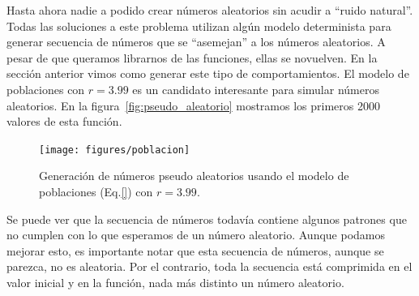 \documentclass[a4paper,10pt]{book}
\begin{document}
 
 Hasta ahora nadie a podido crear números aleatorios sin acudir a ``ruido natural''.
 Todas las soluciones a este problema utilizan algún modelo determinista para generar secuencia de números que se ``asemejan'' a los números aleatorios.
 A pesar de que queramos librarnos de las funciones, ellas se novuelven.
 En la sección anterior vimos como generar este tipo de comportamientos.
 El modelo de poblaciones con $r = 3.99$ es un candidato interesante para simular números aleatorios.
 En la figura~\ref{fig:pseudo_aleatorio} mostramos los primeros 2000 valores de esta función.
 \begin{figure}[ht!]
    \centering
    \texttt{[image: figures/poblacion]}
    \caption{Generación de números pseudo aleatorios usando el modelo de poblaciones (Eq.\ref{}) con $r=3.99$.}
    \label{fig:sensibilidad}
 \end{figure}
 Se puede ver que la secuencia de números todavía contiene algunos patrones que no cumplen con lo que esperamos de un número aleatorio.
 Aunque podamos mejorar esto, es importante notar que esta secuencia de números, aunque se parezca, no es aleatoria.
 Por el contrario, toda la secuencia está comprimida en el valor inicial y en la función, nada más distinto un número aleatorio.
 
 
\end{document}
